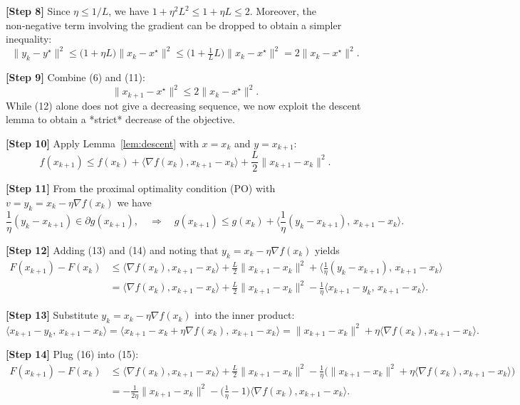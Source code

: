 \documentclass[11pt]{article}
\begin{document}
\begin{enumerate}[label={(\alph*)}]
\noindent\textbf{[Step 8]} Since $\eta\le 1/L$, we have $1+\eta^{2}L^{2}\le 1+ \eta L\le 2$. Moreover, the non‑negative term involving the gradient can be dropped to obtain a simpler inequality:
\[
\|y_{k}-y^{\star}\|^{2}
\le \bigl(1+\eta L\bigr)\|x_{k}-x^{\star}\|^{2}
\le \bigl(1+\tfrac{1}{L}L\bigr)\|x_{k}-x^{\star}\|^{2}
=2\|x_{k}-x^{\star}\|^{2}.
\tag{11}
\]

\noindent\textbf{[Step 9]} Combine (6) and (11):
\[
\|x_{k+1}-x^{\star}\|^{2}\le 2\|x_{k}-x^{\star}\|^{2}.
\tag{12}
\]
While (12) alone does not give a decreasing sequence, we now exploit the descent lemma to obtain a *strict* decrease of the objective.

\bigskip
\noindent\textbf{[Step 10]} Apply Lemma~\ref{lem:descent} with $x=x_{k}$ and $y=x_{k+1}$:
\[
f(x_{k+1})\le f(x_{k})+\langle\nabla f(x_{k}),x_{k+1}-x_{k}\rangle
+\frac{L}{2}\|x_{k+1}-x_{k}\|^{2}.
\tag{13}
\]

\noindent\textbf{[Step 11]} From the proximal optimality condition (PO) with $v=y_{k}=x_{k}-\eta\nabla f(x_{k})$ we have
\[
\frac{1}{\eta}(y_{k}-x_{k+1})\in\partial g(x_{k+1}),
\quad\Longrightarrow\quad
g(x_{k+1})\le g(x_{k})+\Big\langle \frac{1}{\eta}(y_{k}-x_{k+1}),\,x_{k+1}-x_{k}\Big\rangle.
\tag{14}
\]

\noindent\textbf{[Step 12]} Adding (13) and (14) and noting that $y_{k}=x_{k}-\eta\nabla f(x_{k})$ yields
\[
\begin{aligned}
F(x_{k+1})-F(x_{k})
&\le \langle\nabla f(x_{k}),x_{k+1}-x_{k}\rangle
+\frac{L}{2}\|x_{k+1}-x_{k}\|^{2}
+\Big\langle \frac{1}{\eta}(y_{k}-x_{k+1}),\,x_{k+1}-x_{k}\Big\rangle\\
&= \langle\nabla f(x_{k}),x_{k+1}-x_{k}\rangle
+\frac{L}{2}\|x_{k+1}-x_{k}\|^{2}
-\frac{1}{\eta}\langle x_{k+1}-y_{k},\,x_{k+1}-x_{k}\rangle.
\end{aligned}
\tag{15}
\]

\noindent\textbf{[Step 13]} Substitute $y_{k}=x_{k}-\eta\nabla f(x_{k})$ into the inner product:
\[
\langle x_{k+1}-y_{k},\,x_{k+1}-x_{k}\rangle
= \langle x_{k+1}-x_{k}+\eta\nabla f(x_{k}),\,x_{k+1}-x_{k}\rangle
= \|x_{k+1}-x_{k}\|^{2}+\eta\langle\nabla f(x_{k}),x_{k+1}-x_{k}\rangle.
\tag{16}
\]

\noindent\textbf{[Step 14]} Plug (16) into (15):
\[
\begin{aligned}
F(x_{k+1})-F(x_{k})
&\le \langle\nabla f(x_{k}),x_{k+1}-x_{k}\rangle
+\frac{L}{2}\|x_{k+1}-x_{k}\|^{2}
-\frac{1}{\eta}\Big(\|x_{k+1}-x_{k}\|^{2}
+\eta\langle\nabla f(x_{k}),x_{k+1}-x_{k}\rangle\Big)\\
&= -\frac{1}{2\eta}\|x_{k+1}-x_{k}\|^{2}
-\Big(\frac{1}{\eta}-1\Big)\langle\nabla f(x_{k}),x_{k+1}-x_{k}\rangle.
\end{aligned}
\tag{17}
\]


\end{enumerate}
\end{document}
